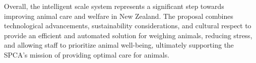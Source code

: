 Overall, the intelligent scale system represents a significant step towards improving animal care and welfare in New Zealand. The proposal combines technological advancements, sustainability considerations, and cultural respect to provide an efficient and automated solution for weighing animals, reducing stress, and allowing staff to prioritize animal well-being, ultimately supporting the SPCA's mission of providing optimal care for animals.

